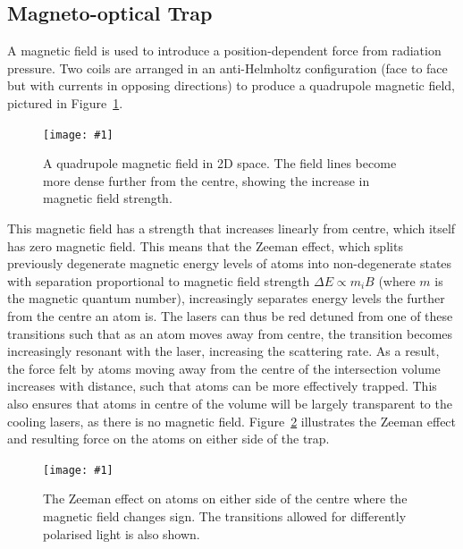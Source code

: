 \documentclass[twocolumn]{article}
\newcommand{\insertFigure}[1]{%
   \texttt{[image: \#1]}%
}
\begin{document}
\subsection{Magneto-optical Trap}
A magnetic field is used to introduce a position-dependent force from radiation pressure. Two coils are arranged in an anti-Helmholtz configuration (face to face but with currents in opposing directions) to produce a quadrupole magnetic field, pictured in Figure~\ref{fig:mag}. 
\begin{figure} [!h]
	\centering
	\insertFigure{Images/Mag.png}
	\caption{A quadrupole magnetic field in 2D space. The field lines become more dense further from the centre, showing the increase in magnetic field strength.~\cite{mag}}
	\label{fig:mag}
\end{figure}
This magnetic field has a strength that increases linearly from centre, which itself has zero magnetic field. This means that the Zeeman effect, which splits previously degenerate magnetic energy levels of atoms into non-degenerate states with separation proportional to magnetic field strength $\Delta E \propto m_iB$ (where $m$ is the magnetic quantum number), increasingly separates energy levels the further from the centre an atom is. The lasers can thus be red detuned from one of these transitions such that as an atom moves away from centre, the transition becomes increasingly resonant with the laser, increasing the scattering rate. As a result, the force felt by atoms moving away from the centre of the intersection volume increases with distance, such that atoms can be more effectively trapped. This also ensures that atoms in centre of the volume will be largely transparent to the cooling lasers, as there is no magnetic field. Figure~\ref{fig:Zeeman} illustrates the Zeeman effect and resulting force on the atoms on either side of the trap. 
\begin{figure} [!h]
	\centering
	\insertFigure{Images/Zeeman.png}
	\caption{The Zeeman effect on atoms on either side of the centre where the magnetic field changes sign. The transitions allowed for differently polarised light is also shown.~\cite{Wieman}}
	\label{fig:Zeeman}
\end{figure}
\end{document}
